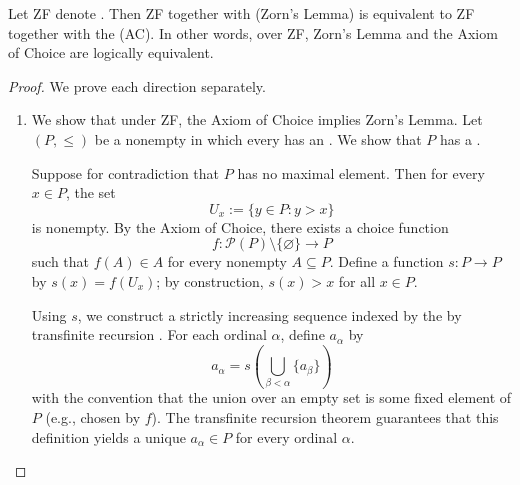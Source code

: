 \begin{lemma} \label{lemma:zorns_lemma_is_equivalent_to_axiom_of_choice_under_ZF}

    Let ZF denote . Then ZF together with  (Zorn's Lemma) is equivalent to ZF together with the  (AC). In other words, over ZF, Zorn's Lemma and the Axiom of Choice are logically equivalent.
\end{lemma}

\begin{proof}

    We prove each direction separately.

    \begin{enumerate}
        \item We show that under ZF, the Axiom of Choice implies Zorn's Lemma. Let $(P, \leq)$ be a nonempty  in which every  has an . We show that $P$ has a .

        Suppose for contradiction that $P$ has no maximal element. Then for every $x \in P$, the set
        $$U_x := \{y \in P : y > x\}$$
        is nonempty. By the Axiom of Choice, there exists a choice function
        $$f: \mathcal{P}(P) \setminus \{\varnothing\} \longrightarrow P$$
        such that $f(A) \in A$ for every nonempty $A \subseteq P$. Define a function $s: P \to P$ by $s(x) = f(U_x)$; by construction, $s(x) > x$ for all $x \in P$.

        Using $s$, we construct a strictly increasing sequence indexed by the  by transfinite recursion . For each ordinal $\alpha$, define $a_\alpha$ by
        $$a_\alpha = s\!\left(\bigcup_{\beta < \alpha} \{a_\beta\}\right)$$
        with the convention that the union over an empty set is some fixed element of $P$ (e.g., chosen by $f$). The transfinite recursion theorem guarantees that this definition yields a unique $a_\alpha \in P$ for every ordinal $\alpha$.


\end{enumerate}
\end{proof}
